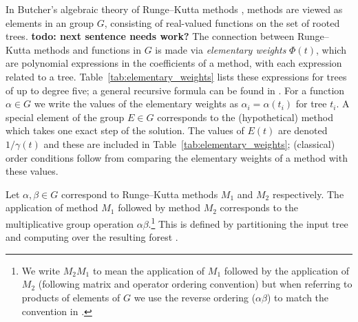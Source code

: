 In Butcher's algebraic theory of Runge--Kutta methods
\cite{Butcher2008_book}, methods are viewed as elements in an group
$G$, consisting of real-valued functions on the set of rooted trees.
\textbf{todo: next sentence needs work?}
The connection between Runge--Kutta methods and functions in $G$ is
made via \emph{elementary weights} $\Phi(t)$, which are polynomial
expressions in the coefficients of a method, with each expression
related to a tree.
Table~\ref{tab:elementary_weights} lists these expressions for trees of
up to degree five; a general recursive formula can be found in
\cite[Definition 312A]{Butcher2008_book}.
For a function $\alpha \in G$ we write the values of the
elementary weights as $\alpha_{i} = \alpha(t_{i})$ for tree $t_{i}$.
A special element of the group $E \in G$ corresponds to the
(hypothetical) method which takes one exact step of the
solution.
The values of $E(t)$ are denoted $1/\gamma(t)$ and these are included in
Table~\ref{tab:elementary_weights}; (classical) order conditions
follow from comparing the elementary weights of a method with these
values.


Let $\alpha, \beta \in G$ correspond to Runge--Kutta methods $M_1$ and $M_2$
respectively.
The application of method $M_1$ followed by method $M_2$ corresponds to
the multiplicative group operation $\alpha\beta$.\footnote{We write
	$M_2M_1$ to mean the application of $M_1$
	followed by the application of $M_2$
	(following matrix and operator ordering convention)
	but when referring to products of elements of $G$
        we use the reverse ordering ($\alpha\beta$)
	to match the convention in \cite{Butcher2008_book}.}
This is defined by partitioning the input tree and computing
over the resulting forest \cite[\textbf{refer section}]{Butcher2008_book}.



